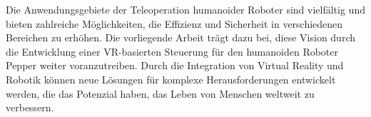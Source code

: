 \noindent
Die Anwendungsgebiete der Teleoperation humanoider Roboter sind vielfältig und bieten zahlreiche Möglichkeiten, die Effizienz und Sicherheit in verschiedenen Bereichen zu erhöhen. Die vorliegende Arbeit trägt dazu bei, diese Vision durch die Entwicklung einer VR-basierten Steuerung für den humanoiden Roboter Pepper weiter voranzutreiben. Durch die Integration von Virtual Reality und Robotik können neue Lösungen für komplexe Herausforderungen entwickelt werden, die das Potenzial haben, das Leben von Menschen weltweit zu verbessern.
